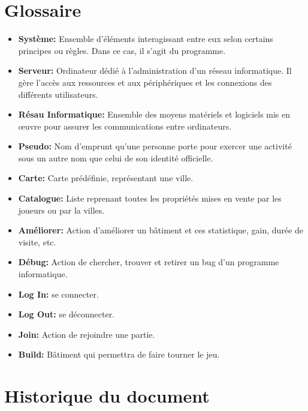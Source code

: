 \documentclass[a4paper,11pt]{report}
\begin{document}
\section{Glossaire}
\begin{itemize}
 \item \textbf{Système:} Ensemble d'éléments interagissant entre eux selon certains principes ou règles. Dans ce cas, il s’agit du programme.
 \item \textbf{Serveur:} Ordinateur dédié à l'administration d'un réseau informatique. Il gère l'accès aux ressources et aux périphériques et les connexions des différents utilisateurs.
 \item \textbf{Résau Informatique:} Ensemble des moyens matériels et logiciels mis en œuvre pour assurer les communications entre ordinateurs.
 \item \textbf{Pseudo:} Nom d'emprunt qu'une personne porte pour exercer une activité sous un autre nom que celui de son identité officielle.
 \item \textbf{Carte:} Carte prédéfinie, représentant une ville.
 \item \textbf{Catalogue:} Liste reprenant toutes les propriétés mises en vente par les joueurs ou par la villes.
 \item \textbf{Améliorer:} Action d'améliorer un bâtiment et ces statistique, gain, durée de visite, etc.
 \item \textbf{Débug:} Action de chercher, trouver et retirer un bug d’un programme informatique.
 \item \textbf{Log In:} se connecter.
 \item \textbf{Log Out:} se déconnecter.
 \item \textbf{Join:} Action de rejoindre une partie.
 \item \textbf{Build:} Bâtiment qui permettra de faire tourner le jeu.
\end{itemize}

\section{Historique du document}
\end{document}
